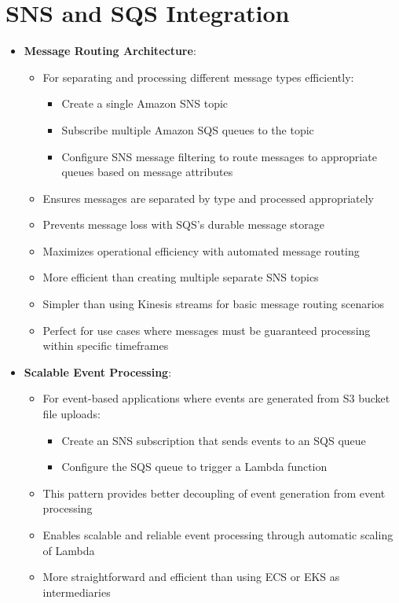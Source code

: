 \documentclass[11pt,a4paper]{report}
\begin{document}
\section{SNS and SQS Integration}

\begin{itemize}
  \item \textbf{Message Routing Architecture}:
\begin{itemize}
  \item For separating and processing different message types efficiently:
\begin{itemize}
  \item Create a single Amazon SNS topic
  \item Subscribe multiple Amazon SQS queues to the topic
  \item Configure SNS message filtering to route messages to appropriate queues based on message attributes
\end{itemize}
  \item Ensures messages are separated by type and processed appropriately
  \item Prevents message loss with SQS's durable message storage
  \item Maximizes operational efficiency with automated message routing
  \item More efficient than creating multiple separate SNS topics
  \item Simpler than using Kinesis streams for basic message routing scenarios
  \item Perfect for use cases where messages must be guaranteed processing within specific timeframes
\end{itemize}
  \item \textbf{Scalable Event Processing}:
\begin{itemize}
  \item For event-based applications where events are generated from S3 bucket file uploads:
\begin{itemize}
  \item Create an SNS subscription that sends events to an SQS queue
  \item Configure the SQS queue to trigger a Lambda function
\end{itemize}
  \item This pattern provides better decoupling of event generation from event processing
  \item Enables scalable and reliable event processing through automatic scaling of Lambda
  \item More straightforward and efficient than using ECS or EKS as intermediaries

\end{itemize}
\end{itemize}
\end{document}
